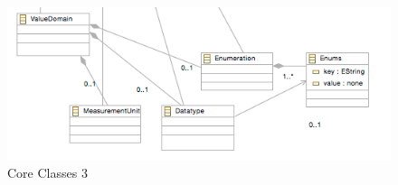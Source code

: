 \documentclass{article}
\begin{document}
\begin{figure}[here]
\includegraphics[scale=0.4]{images/core3}
\caption{Core Classes 3} 
\label{fig:core3}
\end{figure}



\newpage




\end{document}

